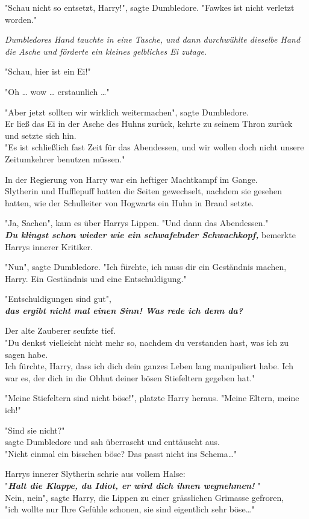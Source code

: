 {"Schau nicht so entsetzt, Harry!", sagte Dumbledore. "Fawkes ist nicht verletzt worden."

\emph{Dumbledores Hand tauchte in eine Tasche, und dann durchwühlte dieselbe Hand die Asche und förderte ein kleines gelbliches Ei zutage.}

"Schau, hier ist ein Ei!"

"Oh … wow … erstaunlich …"

"Aber jetzt sollten wir wirklich weitermachen", sagte Dumbledore.\\ Er ließ das Ei in der Asche des Huhns zurück, kehrte zu seinem Thron zurück und setzte sich hin.\\ "Es ist schließlich fast Zeit für das Abendessen, und wir wollen doch nicht unsere Zeitumkehrer benutzen müssen."

In der Regierung von Harry war ein heftiger Machtkampf im Gange.\\ Slytherin und Hufflepuff hatten die Seiten gewechselt, nachdem sie gesehen hatten, wie der Schulleiter von Hogwarts ein Huhn in Brand setzte.

"Ja, Sachen", kam es über Harrys Lippen. "Und dann das Abendessen."\\ \textbf{\emph{Du klingst schon wieder wie ein schwafelnder Schwachkopf,}} bemerkte Harrys innerer Kritiker.

"Nun", sagte Dumbledore. "Ich fürchte, ich muss dir ein Geständnis machen, Harry. Ein Geständnis und eine Entschuldigung."

"Entschuldigungen sind gut",\\ \textbf{\emph{das ergibt nicht mal einen Sinn! Was rede ich denn da?}}

Der alte Zauberer seufzte tief.\\ "Du denkst vielleicht nicht mehr so, nachdem du verstanden hast, was ich zu sagen habe.\\ Ich fürchte, Harry, dass ich dich dein ganzes Leben lang manipuliert habe. Ich war es, der dich in die Obhut deiner bösen Stiefeltern gegeben hat."

"Meine Stiefeltern sind nicht böse!", platzte Harry heraus. "Meine Eltern, meine ich!"

"Sind sie nicht?"\\ sagte Dumbledore und sah überrascht und enttäuscht aus.\\ "Nicht einmal ein bisschen böse? Das passt nicht ins Schema…"

Harrys innerer Slytherin schrie aus vollem Halse:\\ "\textbf{\emph{Halt die Klappe, du Idiot, er wird dich ihnen wegnehmen!}} "\\ Nein, nein", sagte Harry, die Lippen zu einer grässlichen Grimasse gefroren,\\ "ich wollte nur Ihre Gefühle schonen, sie sind eigentlich sehr böse…"

}
